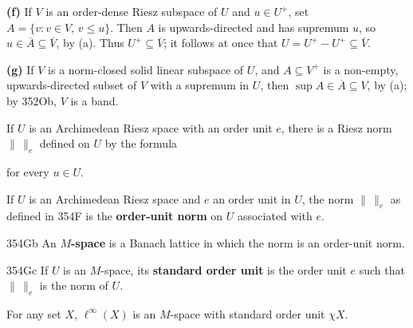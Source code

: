 {\medskip

{\bf (f)} If $V$ is an order-dense Riesz subspace of $U$ and $u\in U^+$,
set $A=\{v:v\in V,\,v\le u\}$.   Then $A$ is upwards-directed and
has supremum $u$, so $u\in\overline{A}\subseteq\overline{V}$, by (a).
Thus $U^+\subseteq\overline{V}$;  it follows at once that
$U=U^+-U^+\subseteq\overline{V}$.

\medskip

{\bf (g)} If $V$ is a norm-closed solid linear subspace of $U$,
and $A\subseteq V^+$ is a non-empty, upwards-directed subset of $V$ with a
supremum in $U$, then $\sup A\in\overline{A}\subseteq V$, by (a);  by
352Ob, $V$ is a band.
}%

 If $U$ is an Archimedean Riesz space with an
order unit $e$, there is a Riesz norm
$\|\,\|_e$ defined on $U$ by the formula


\noindent for every $u\in U$.


 If $U$ is an Archimedean Riesz space and
$e$ an order unit in $U$, the norm $\|\,\|_e$ as defined in 354F is the
{\bf order-unit norm} on $U$ associated with $e$.

\spheader 354Gb An {\bf $M$-space} is a Banach lattice in which the norm
is an order-unit norm.

\spheader 354Gc If $U$ is an $M$-space, its {\bf standard order unit} is
the order unit $e$ such that $\|\,\|_e$ is the norm of $U$.

 For any set $X$, $\ell^{\infty}(X)$ is an
$M$-space with standard order unit $\chi X$.   

